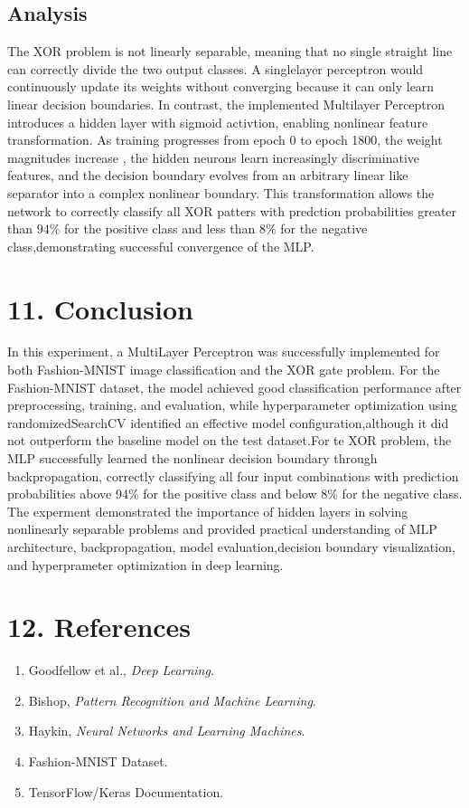\documentclass[11pt]{article}
\begin{document}
\subsection{Analysis}

The XOR problem is not linearly separable, meaning that no single straight line can correctly divide the two output classes. A singlelayer perceptron would continuously update its weights without converging because it can only learn linear decision boundaries. In contrast, the implemented Multilayer Perceptron introduces a hidden layer with sigmoid activtion, enabling nonlinear feature transformation. As training progresses from epoch 0 to epoch 1800, the weight magnitudes increase , the hidden neurons learn increasingly discriminative features, and the decision boundary evolves from an arbitrary linear like separator into a complex nonlinear boundary. This transformation allows the network to correctly classify all XOR patters with predction probabilities greater than $94\%$ for the positive class and less than $8\%$ for the negative class,demonstrating successful convergence of the MLP.

\section*{11. Conclusion}

In this experiment, a MultiLayer Perceptron was successfully implemented for both Fashion-MNIST image classification and the XOR gate problem. For the Fashion-MNIST dataset, the model achieved good classification performance after preprocessing, training, and evaluation, while hyperparameter optimization using randomizedSearchCV identified an effective model configuration,although it did not outperform the baseline model on the test dataset.For te XOR problem, the MLP successfully learned the nonlinear decision boundary through backpropagation, correctly classifying all four input combinations with prediction probabilities above 94\% for the positive class and below 8\% for the negative class. The experment demonstrated the importance of hidden layers in solving nonlinearly separable problems and provided practical understanding of MLP architecture, backpropagation, model evaluation,decision boundary visualization, and hyperprameter optimization in deep learning.

\section*{12. References}
\begin{enumerate}
\item Goodfellow et al., \emph{Deep Learning}.
\item Bishop, \emph{Pattern Recognition and Machine Learning}.
\item Haykin, \emph{Neural Networks and Learning Machines}.
\item Fashion-MNIST Dataset.
\item TensorFlow/Keras Documentation.
\end{enumerate}
\end{document}
